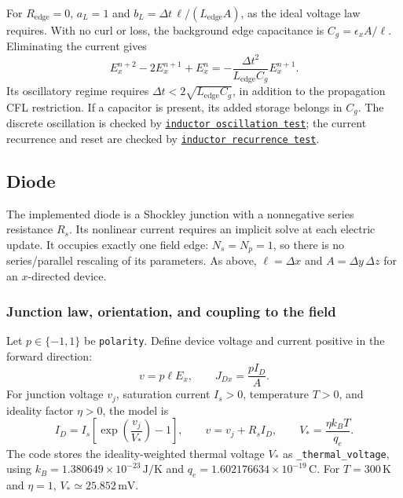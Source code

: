 \documentclass[10pt]{article}
\newcommand{\sourcecode}[2]{\href{https://github.com/tiagovla/fdtd.py/blob/7027c252cd23b6cfb8cb197e361dacfac9fd1c72/#1}{\texttt{#2}}}
\begin{document}
For $R_{\mathrm{edge}}=0$, $a_L=1$ and
$b_L=\Delta t\,\ell/(L_{\mathrm{edge}}A)$, as the ideal voltage law
requires. With no curl or loss, the background edge capacitance is
$C_g=\epsilon_x A/\ell$. Eliminating the current gives
\begin{equation}
    E_x^{n+2}-2E_x^{n+1}+E_x^n
       =-\frac{\Delta t^2}{L_{\mathrm{edge}}C_g}E_x^{n+1}.
\end{equation}
Its oscillatory regime requires
$\Delta t<2\sqrt{L_{\mathrm{edge}}C_g}$, in addition to the propagation
CFL restriction. If a capacitor is present, its added storage belongs
in $C_g$. The discrete oscillation is checked by
\sourcecode{tests/test_physics.py\#L94-L105}{inductor oscillation test};
the current recurrence and reset are checked by
\sourcecode{tests/test_lumped_elements.py\#L43-L56}{inductor recurrence test}.

\subsection{Diode}
\label{sec:diode}
The implemented diode is a Shockley junction with a nonnegative series
resistance $R_s$. Its nonlinear current requires an implicit solve at
each electric update. It occupies exactly one field edge:
$N_s=N_p=1$, so there is no series/parallel rescaling of its parameters.
As above, $\ell=\Delta x$ and $A=\Delta y\,\Delta z$ for an
$x$-directed device.

\subsubsection{Junction law, orientation, and coupling to the field}
Let $p\in\{-1,1\}$ be \texttt{polarity}. Define device voltage and
current positive in the forward direction:
\begin{equation}
    v=p\ell E_x,\qquad J_{Dx}=\frac{pI_D}{A}.
\end{equation}
For junction voltage $v_j$, saturation current $I_s>0$, temperature
$T>0$, and ideality factor $\eta>0$, the model is
\begin{equation}
    \boxed{I_D=I_s\left[\exp\left(\frac{v_j}{V_*}\right)-1\right],
       \qquad v=v_j+R_s I_D,\qquad V_*=\frac{\eta k_B T}{q_e}.}
    \label{eq:diode-law}
\end{equation}
The code stores the ideality-weighted thermal voltage $V_*$ as
\texttt{\_thermal\_voltage}, using
$k_B=1.380649\times10^{-23}\,\mathrm{J/K}$ and
$q_e=1.602176634\times10^{-19}\,\mathrm{C}$.
For $T=300\,\mathrm K$ and $\eta=1$, $V_*\simeq25.852\,\mathrm{mV}$.
\end{document}
